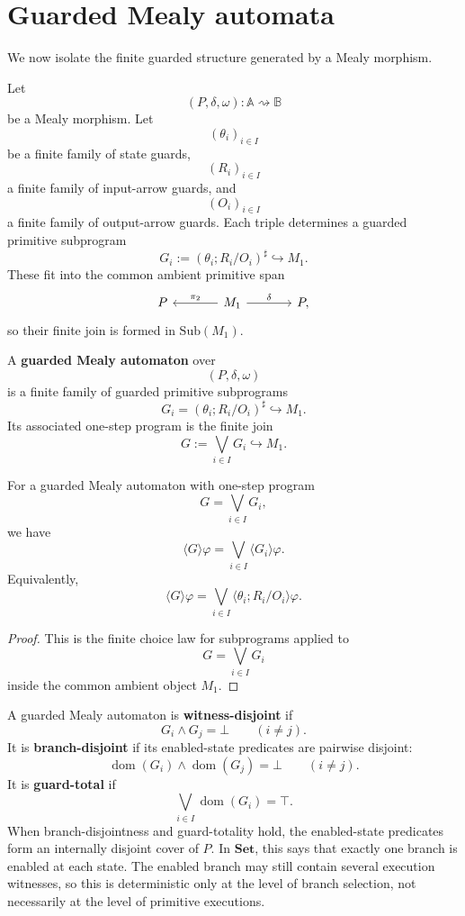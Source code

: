 \section{Guarded Mealy automata}
\label{sec:guarded-mealy-automata}

We now isolate the finite guarded structure generated by a Mealy morphism.

Let
\[
(P,\delta,\omega):\mathbb A\rightsquigarrow\mathbb B
\]
be a Mealy morphism. Let
\[
(\theta_i)_{i\in I}
\]
be a finite family of state guards,
\[
(R_i)_{i\in I}
\]
a finite family of input-arrow guards, and
\[
(O_i)_{i\in I}
\]
a finite family of output-arrow guards. Each triple determines a guarded
primitive subprogram
\[
G_i:=(\theta_i;R_i/O_i)^\sharp\hookrightarrow M_1.
\]
These fit into the common ambient primitive span
\[
\begin{tikzcd}[column sep=large]
P
&
M_1
  \arrow[l, "\pi_2"']
  \arrow[r, "\delta"]
&
P ,
\end{tikzcd}
\]
so their finite join is formed in \(\mathrm{Sub}(M_1)\).

\begin{definition}
\label{def:guarded-mealy-automaton}
A \textbf{guarded Mealy automaton} over
\[
(P,\delta,\omega)
\]
is a finite family of guarded primitive subprograms
\[
G_i=(\theta_i;R_i/O_i)^\sharp\hookrightarrow M_1.
\]
Its associated one-step program is the finite join
\[
G:=\bigvee_{i\in I}G_i\hookrightarrow M_1.
\]
\end{definition}

\begin{proposition}
\label{prop:guarded-mealy-automaton-diamond}
For a guarded Mealy automaton with one-step program
\[
G=\bigvee_{i\in I}G_i,
\]
we have
\[
\langle G\rangle\varphi
=
\bigvee_{i\in I}
\langle G_i\rangle\varphi.
\]
Equivalently,
\[
\langle G\rangle\varphi
=
\bigvee_{i\in I}
\langle \theta_i;R_i/O_i\rangle\varphi.
\]
\end{proposition}

\begin{proof}
This is the finite choice law for subprograms applied to
\[
G=\bigvee_{i\in I}G_i
\]
inside the common ambient object \(M_1\).
\end{proof}

A guarded Mealy automaton is \textbf{witness-disjoint} if
\[
G_i\wedge G_j=\bot
\qquad
(i\ne j).
\]
It is \textbf{branch-disjoint} if its enabled-state predicates are
pairwise disjoint:
\[
\operatorname{dom}(G_i)\wedge \operatorname{dom}(G_j)=\bot
\qquad
(i\ne j).
\]
It is \textbf{guard-total} if
\[
\bigvee_{i\in I}\operatorname{dom}(G_i)=\top.
\]
When branch-disjointness and guard-totality hold, the enabled-state
predicates form an internally disjoint cover of \(P\). In \(\mathbf{Set}\),
this says that exactly one branch is enabled at each state. The enabled
branch may still contain several execution witnesses, so this is
deterministic only at the level of branch selection, not necessarily at
the level of primitive executions.

